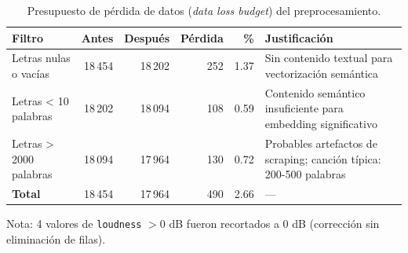 \begin{table}[htbp]
\centering
\caption{Presupuesto de pérdida de datos (\textit{data loss budget}) del preprocesamiento.}
\label{tab:data_loss_budget}
\small
\begin{tabular}{lrrrrl}
\toprule
Filtro & Antes & Después & Pérdida & \% & Justificación \\
\midrule
Letras nulas o vacías & 18\,454 & 18\,202 & 252 & 1.37 & Sin contenido textual para vectorización semántica \\
Letras < 10 palabras & 18\,202 & 18\,094 & 108 & 0.59 & Contenido semántico insuficiente para embedding significativo \\
Letras > 2000 palabras & 18\,094 & 17\,964 & 130 & 0.72 & Probables artefactos de scraping; canción típica: 200-500 palabras \\
\midrule
\textbf{Total} & 18\,454 & 17\,964 & 490 & 2.66 & --- \\
\bottomrule
\end{tabular}
\vspace{0.5em}
\footnotesize{Nota: 4 valores de \texttt{loudness} $> 0$ dB fueron recortados a 0 dB (corrección sin eliminación de filas).}
\end{table}